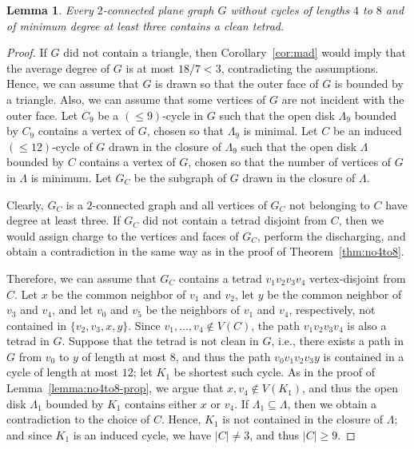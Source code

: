 \documentclass[12pt,twoside,openright,a4paper]{book}
\newtheorem{lemma}[theorem]{Lemma}
\begin{document}
\begin{lemma}\label{lemma:no4to8-exred}
Every $2$-connected plane graph $G$ without cycles of lengths $4$ to $8$ and of minimum degree at least three
contains a clean tetrad.
\end{lemma}
\begin{proof}
If $G$ did not contain a triangle, then Corollary~\ref{cor:mad} would imply that the average degree of $G$ is
at most $18/7<3$, contradicting the assumptions.
Hence, we can assume that $G$ is drawn so that the outer face of $G$ is bounded by a triangle.
Also, we can assume that some vertices of $G$ are not incident with the outer face.
Let $C_9$ be a $(\le\!9)$-cycle in $G$ such that the open disk $\Lambda_9$ bounded by $C_9$ contains a vertex of $G$,
chosen so that $\Lambda_9$ is minimal.  Let $C$ be an induced $(\le\!12)$-cycle of $G$ drawn in the closure of $\Lambda_9$
such that the open disk $\Lambda$ bounded by $C$ contains a vertex of $G$, chosen so that the number of vertices of $G$
in $\Lambda$ is minimum.  Let $G_C$ be the subgraph of $G$ drawn in the closure of $\Lambda$.

Clearly, $G_C$ is a $2$-connected graph and all vertices of $G_C$ not belonging to $C$ have degree at least three.
If $G_C$ did not contain a tetrad disjoint from $C$, then we would 
assign charge to the vertices and faces of $G_C$, perform the discharging, and obtain a contradiction in the same way as in
the proof of Theorem~\ref{thm:no4to8}.

Therefore, we can assume that $G_C$ contains a tetrad $v_1v_2v_3v_4$ vertex-disjoint from $C$.
Let $x$ be the common neighbor of $v_1$ and $v_2$, let $y$ be the common neighbor of $v_3$ and $v_4$,
and let $v_0$ and $v_5$ be the neighbors of $v_1$ and $v_4$, respectively, not contained in $\{v_2,v_3,x,y\}$.
Since $v_1,\ldots, v_4\not\in V(C)$, the path $v_1v_2v_3v_4$ is also a tetrad in $G$.  Suppose that the tetrad is not
clean in $G$, i.e., there exists a path in $G$
from $v_0$ to $y$ of length at most $8$, and thus the path $v_0v_1v_2v_3y$ is contained in a cycle of length at most $12$;
let $K_1$ be shortest such cycle. As in the proof of Lemma~\ref{lemma:no4to8-prop}, we argue that $x,v_4\not\in V(K_1)$,
and thus the open disk $\Lambda_1$ bounded by $K_1$ contains either $x$ or $v_4$.
If $\Lambda_1\subseteq\Lambda$, then we obtain a contradiction to the choice
of $C$.  Hence, $K_1$ is not contained in the closure of $\Lambda$; and since $K_1$ is an induced cycle, we have $|C|\neq 3$,
and thus $|C|\ge 9$.


\end{proof}
\end{document}
